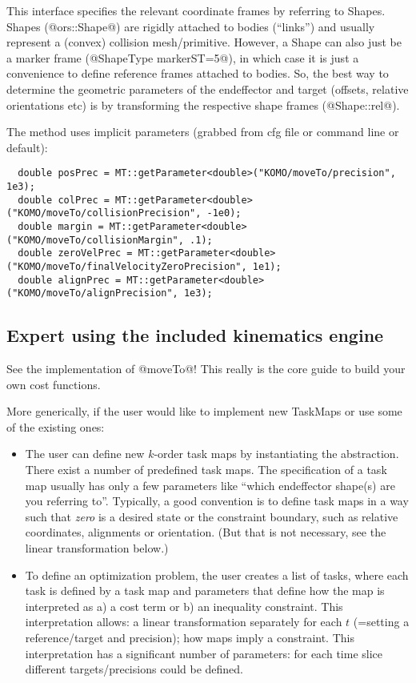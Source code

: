 \documentclass[10pt,fleqn,twoside]{article}
\begin{document}
This interface specifies the relevant coordinate frames by referring
to Shapes. Shapes (@ors::Shape@) are rigidly attached to bodies
(``links'') and usually represent a (convex) collision
mesh/primitive. However, a Shape can also just be a marker frame
(@ShapeType markerST=5@), in which case it is just a convenience to
define reference frames attached to bodies. So, the best way to
determine the geometric parameters of the endeffector and target
(offsets, relative orientations etc) is by transforming the respective
shape frames (@Shape::rel@).

The method uses implicit parameters (grabbed from cfg file or command line or default):
\begin{code}
\begin{verbatim}
  double posPrec = MT::getParameter<double>("KOMO/moveTo/precision", 1e3);
  double colPrec = MT::getParameter<double>("KOMO/moveTo/collisionPrecision", -1e0);
  double margin = MT::getParameter<double>("KOMO/moveTo/collisionMargin", .1);
  double zeroVelPrec = MT::getParameter<double>("KOMO/moveTo/finalVelocityZeroPrecision", 1e1);
  double alignPrec = MT::getParameter<double>("KOMO/moveTo/alignPrecision", 1e3);
\end{verbatim}
\end{code}


\subsection{Expert using the included kinematics engine}

See the implementation of @moveTo@! This really is the core guide to
build your own cost functions.

More generically, if the user would like to implement new TaskMaps or
use some of the existing ones:
\begin{itemize}
\item The user can define new $k$-order task maps by instantiating the
abstraction. There exist a number of predefined task maps. The
specification of a task map usually has only a few parameters like
``which endeffector shape(s) are you referring to''. Typically, a good
convention is to define task maps in a way such that \emph{zero} is a
desired state or the constraint boundary, such as relative
coordinates, alignments or orientation. (But that is not necessary,
see the linear transformation below.)

\item To define an optimization problem, the user creates a list of
tasks, where each task is defined by a task map and parameters that
define how the map is interpreted as a) a cost term or b) an inequality
constraint. This interpretation allows: a linear
transformation separately for each $t$ (=setting a reference/target
and precision); how maps imply a constraint. This interpretation has a
significant number of parameters: for each time slice different
targets/precisions could be defined.
\end{itemize}
\end{document}
